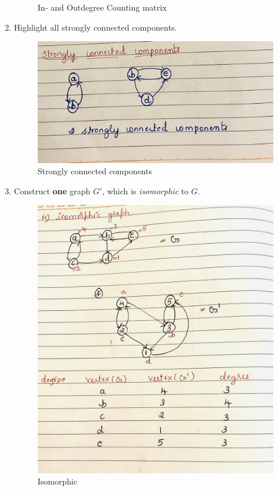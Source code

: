 \documentclass{resources/WeSTassignment}
\begin{document}
\begin{enumerate}
\begin{figure}[ht]
    \caption{In- and Outdegree Counting matrix}
    \label{fig:In- and Outdegree Counting matrix}
\end{figure}
    \item Highlight all strongly connected components.
    \begin{figure}[ht]
    \centering
    \includegraphics[scale=0.2]{./resources/2.3.jpeg}
    \caption{Strongly connected components}
    \label{fig:Strongly connected components}
\end{figure}
    \item Construct \textbf{one} graph $G'$, which is \emph{isomorphic} to $G$.
    \begin{figure}[ht]
    \centering
    \includegraphics[scale=0.4]{./resources/2.4.jpeg}
    \caption{Isomorphic}
    \label{fig:Isomorphic}
\end{figure}
\end{enumerate}
\newpage
\end{document}
